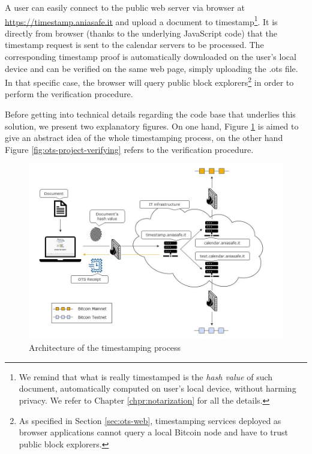 \bigskip
\noindent
A user can easily connect to the public web server via browser at \url{https://timestamp.aniasafe.it} and upload a document to timestamp\footnote{We remind that what is really timestamped is the \textit{hash value} of such document, automatically computed on user's local device, without harming privacy. We refer to Chapter \ref{chpr:notarization} for all the details.}. It is directly from browser (thanks to the underlying JavaScript code) that the timestamp request is sent to the calendar servers to be processed. The corresponding timestamp proof is automatically downloaded on the user's local device and can be verified on the same web page, simply uploading the \colorbox{light-gray}{.ots} file. In that specific case, the browser will query public block explorers\footnote{As specified in Section \ref{sec:ots-web}, timestamping services deployed as browser applications cannot query a local Bitcoin node and have to trust public block explorers.} in order to perform the verification procedure. 

\bigskip
\noindent
Before getting into technical details regarding the code base that underlies this solution, we present two explanatory figures. On one hand, Figure \ref{fig:ots-project-stamping} is aimed to give an abstract idea of the whole timestamping process, on the other hand Figure \ref{fig:ots-project-verifying} refers to the verification procedure.

\begin{figure}[!htb]
    \centering
	\includegraphics[width=1\linewidth]{Images/project-stamping.jpg}
	\caption{Architecture of the timestamping process}
	\label{fig:ots-project-stamping}
\end{figure}

